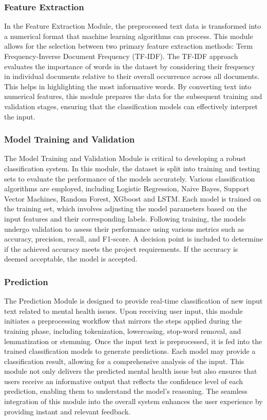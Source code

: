 \subsubsection{Feature Extraction}
\noindent
In the Feature Extraction Module, the preprocessed text data is transformed into a numerical format that machine learning algorithms can process. This module allows for the selection between two primary feature extraction methods: Term Frequency-Inverse Document Frequency (TF-IDF). The TF-IDF approach evaluates the importance of words in the dataset by considering their frequency in individual documents relative to their overall occurrence across all documents. This helps in highlighting the most informative words. By converting text into numerical features, this module prepares the data for the subsequent training and validation stages, ensuring that the classification models can effectively interpret the input.

\subsubsection{Model Training and Validation}
\noindent
The Model Training and Validation Module is critical to developing a robust classification system. In this module, the dataset is split into training and testing sets to evaluate the performance of the models accurately. Various classification algorithms are employed, including Logistic Regression, Naive Bayes, Support Vector Machines, Random Forest, XGboost and LSTM. Each model is trained on the training set, which involves adjusting the model parameters based on the input features and their corresponding labels. Following training, the models undergo validation to assess their performance using various metrics such as accuracy, precision, recall, and F1-score. A decision point is included to determine if the achieved accuracy meets the project requirements. If the accuracy is deemed acceptable, the model is accepted. 

\subsubsection{Prediction}
\noindent
The Prediction Module is designed to provide real-time classification of new input text related to mental health issues. Upon receiving user input, this module initiates a preprocessing workflow that mirrors the steps applied during the training phase, including tokenization, lowercasing, stop-word removal, and lemmatization or stemming. Once the input text is preprocessed, it is fed into the trained classification models to generate predictions. Each model may provide a classification result, allowing for a comprehensive analysis of the input. This module not only delivers the predicted mental health issue but also ensures that users receive an informative output that reflects the confidence level of each prediction, enabling them to understand the model's reasoning. The seamless integration of this module into the overall system enhances the user experience by providing instant and relevant feedback.

